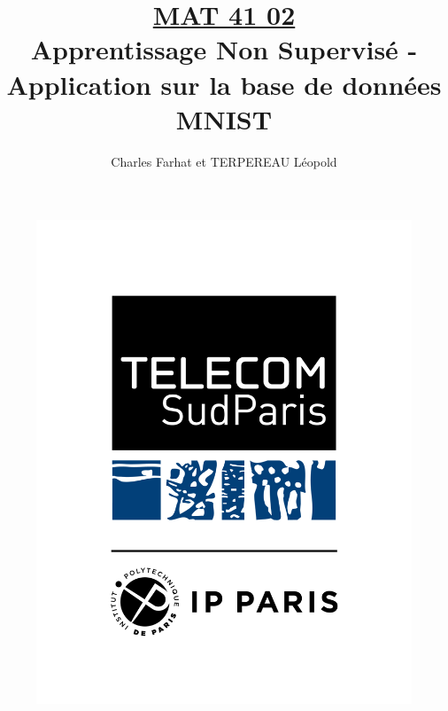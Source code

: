 \documentclass{article}
\title{
    \underline{MAT 41 02} \\
    Apprentissage Non Supervisé - Application sur la base de données MNIST
}
\author{Charles Farhat et TERPEREAU Léopold}
\begin{document}
\maketitle

\begin{figure}[h]
    \centering
    \includegraphics[scale=0.22]{Images/1024-1318.png}
\end{figure}


\newpage
{}
\begin{center}

    \tableofcontents
\end{center}
\end{document}
